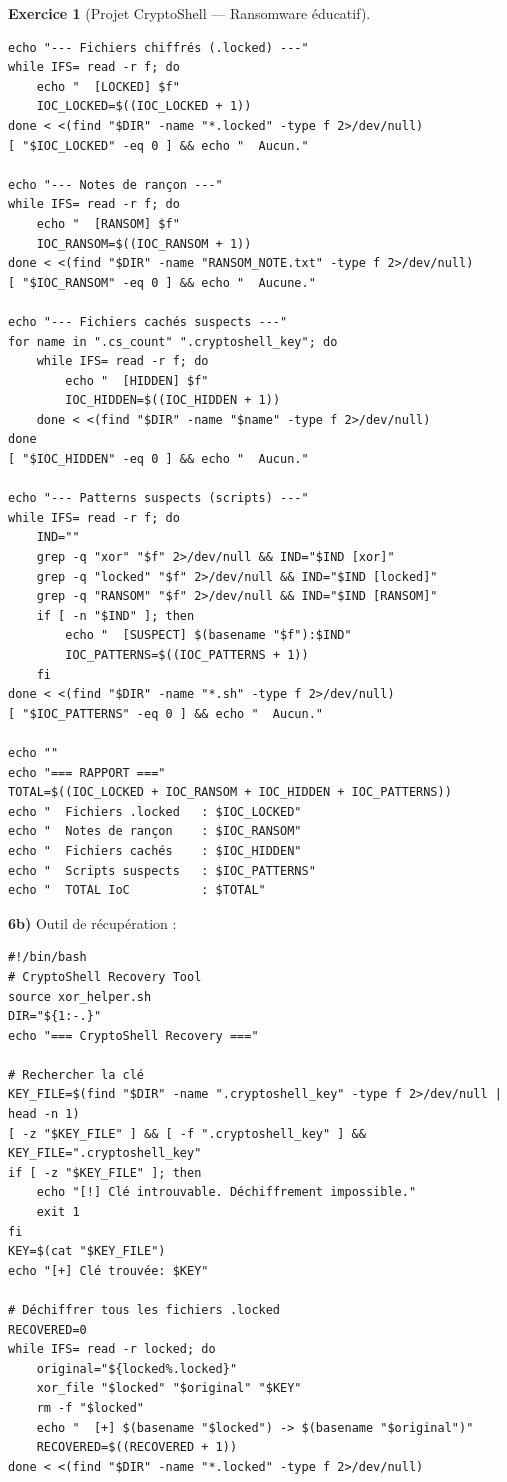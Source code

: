 \documentclass[a4paper,11pt]{article}
\theoremstyle{plain}
\theoremstyle{definition}
\newtheorem{exercice}{Exercice}
\begin{document}
\begin{exercice}[Projet CryptoShell --- Ransomware éducatif]
\begin{correction}
\begin{lstlisting}[title=scanner.sh (phase6\_scanner.sh)]
echo "--- Fichiers chiffrés (.locked) ---"
while IFS= read -r f; do
    echo "  [LOCKED] $f"
    IOC_LOCKED=$((IOC_LOCKED + 1))
done < <(find "$DIR" -name "*.locked" -type f 2>/dev/null)
[ "$IOC_LOCKED" -eq 0 ] && echo "  Aucun."

echo "--- Notes de rançon ---"
while IFS= read -r f; do
    echo "  [RANSOM] $f"
    IOC_RANSOM=$((IOC_RANSOM + 1))
done < <(find "$DIR" -name "RANSOM_NOTE.txt" -type f 2>/dev/null)
[ "$IOC_RANSOM" -eq 0 ] && echo "  Aucune."

echo "--- Fichiers cachés suspects ---"
for name in ".cs_count" ".cryptoshell_key"; do
    while IFS= read -r f; do
        echo "  [HIDDEN] $f"
        IOC_HIDDEN=$((IOC_HIDDEN + 1))
    done < <(find "$DIR" -name "$name" -type f 2>/dev/null)
done
[ "$IOC_HIDDEN" -eq 0 ] && echo "  Aucun."

echo "--- Patterns suspects (scripts) ---"
while IFS= read -r f; do
    IND=""
    grep -q "xor" "$f" 2>/dev/null && IND="$IND [xor]"
    grep -q "locked" "$f" 2>/dev/null && IND="$IND [locked]"
    grep -q "RANSOM" "$f" 2>/dev/null && IND="$IND [RANSOM]"
    if [ -n "$IND" ]; then
        echo "  [SUSPECT] $(basename "$f"):$IND"
        IOC_PATTERNS=$((IOC_PATTERNS + 1))
    fi
done < <(find "$DIR" -name "*.sh" -type f 2>/dev/null)
[ "$IOC_PATTERNS" -eq 0 ] && echo "  Aucun."

echo ""
echo "=== RAPPORT ==="
TOTAL=$((IOC_LOCKED + IOC_RANSOM + IOC_HIDDEN + IOC_PATTERNS))
echo "  Fichiers .locked   : $IOC_LOCKED"
echo "  Notes de rançon    : $IOC_RANSOM"
echo "  Fichiers cachés    : $IOC_HIDDEN"
echo "  Scripts suspects   : $IOC_PATTERNS"
echo "  TOTAL IoC          : $TOTAL"
\end{lstlisting}

\textbf{6b)} Outil de récupération :
\begin{lstlisting}[title=recovery.sh (phase6\_recovery.sh)]
#!/bin/bash
# CryptoShell Recovery Tool
source xor_helper.sh
DIR="${1:-.}"
echo "=== CryptoShell Recovery ==="

# Rechercher la clé
KEY_FILE=$(find "$DIR" -name ".cryptoshell_key" -type f 2>/dev/null | head -n 1)
[ -z "$KEY_FILE" ] && [ -f ".cryptoshell_key" ] && KEY_FILE=".cryptoshell_key"
if [ -z "$KEY_FILE" ]; then
    echo "[!] Clé introuvable. Déchiffrement impossible."
    exit 1
fi
KEY=$(cat "$KEY_FILE")
echo "[+] Clé trouvée: $KEY"

# Déchiffrer tous les fichiers .locked
RECOVERED=0
while IFS= read -r locked; do
    original="${locked%.locked}"
    xor_file "$locked" "$original" "$KEY"
    rm -f "$locked"
    echo "  [+] $(basename "$locked") -> $(basename "$original")"
    RECOVERED=$((RECOVERED + 1))
done < <(find "$DIR" -name "*.locked" -type f 2>/dev/null)


\end{lstlisting}
\end{correction}
\end{exercice}
\end{document}
